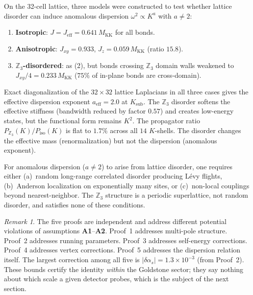 \documentclass[12pt]{article}
\theoremstyle{definition}
\theoremstyle{remark}
\newtheorem{remark}[theorem]{Remark}
\begin{document}
On the 32-cell lattice, three models were constructed to test whether lattice disorder can induce anomalous dispersion $\omega^2 \propto K^a$ with $a \neq 2$:

\begin{enumerate}
  \item \textbf{Isotropic}: $J = J_{\mathrm{eff}} = 0.641\,M_{\mathrm{KK}}$ for all bonds.
  \item \textbf{Anisotropic}: $J_{xy} = 0.933$, $J_z = 0.059\,M_{\mathrm{KK}}$ (ratio $15.8$).
  \item \textbf{$\mathbb{Z}_3$-disordered}: as (2), but bonds crossing $\mathbb{Z}_3$ domain walls weakened to $J_{xy}/4 = 0.233\,M_{\mathrm{KK}}$ ($75\%$ of in-plane bonds are cross-domain).
\end{enumerate}

Exact diagonalization of the $32 \times 32$ lattice Laplacians in all three cases gives the effective dispersion exponent $a_{\mathrm{eff}} = 2.0$ at $K_{\mathrm{sub}}$. The $\mathbb{Z}_3$ disorder softens the effective stiffness (bandwidth reduced by factor $0.57$) and creates low-energy states, but the functional form remains $K^2$. The propagator ratio $P_{\mathbb{Z}_3}(K)/P_{\mathrm{iso}}(K)$ is flat to $1.7\%$ across all $14$ $K$-shells. The disorder changes the effective mass (renormalization) but not the dispersion (anomalous exponent).

For anomalous dispersion ($a \neq 2$) to arise from lattice disorder, one requires either (a)~random long-range correlated disorder producing L\'evy flights, (b)~Anderson localization on exponentially many sites, or (c)~non-local couplings beyond nearest-neighbor. The $\mathbb{Z}_3$ structure is a periodic superlattice, not random disorder, and satisfies none of these conditions.

\begin{remark}
The five proofs are independent and address different potential violations of assumptions \textbf{A1}--\textbf{A2}. Proof~1 addresses multi-pole structure. Proof~2 addresses running parameters. Proof~3 addresses self-energy corrections. Proof~4 addresses vertex corrections. Proof~5 addresses the dispersion relation itself. The largest correction among all five is $|\delta\alpha_s| = 1.3 \times 10^{-3}$ (from Proof~2). These bounds certify the identity \emph{within} the Goldstone sector; they say nothing about which scale a given detector probes, which is the subject of the next section.
\end{remark}
\end{document}
